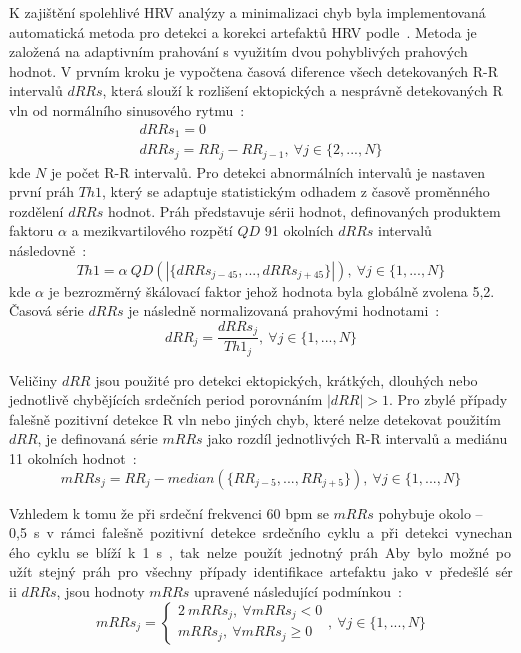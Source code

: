 K zajištění spolehlivé HRV analýzy a minimalizaci chyb byla implementovaná
automatická metoda pro detekci a korekci artefaktů HRV
podle~\cite{Lipponen2019}. Metoda je založená na adaptivním prahování s využitím
dvou pohyblivých prahových hodnot. V prvním kroku je vypočtena časová diference
všech detekovaných R-R intervalů $dRRs$, která slouží k rozlišení ektopických a
nesprávně detekovaných R vln od normálního sinusového rytmu~\cite{Lipponen2019}:
\begin{gather}
    dRRs_1 = 0 \nonumber \\
    dRRs_j = RR_j - RR_{j-1}, ~\forall j \in \{2,...,N\}
\end{gather}
kde $N$ je počet R-R intervalů. Pro detekci abnormálních intervalů je nastaven
první práh $Th1$, který se adaptuje statistickým odhadem z časově proměnného
rozdělení $dRRs$ hodnot. Práh představuje sérii hodnot, definovaných produktem
faktoru $\alpha$ a mezikvartilového rozpětí $QD$ 91 okolních $dRRs$ intervalů
následovně~\cite{Lipponen2019}:
\begin{equation}
    Th1 = \alpha~QD(|\{dRRs_{j-45},...,dRRs_{j+45}\}|), ~\forall j \in \{1,...,N\}
\end{equation}
kde $\alpha$ je bezrozměrný škálovací faktor jehož hodnota byla globálně zvolena
5,2. Časová série $dRRs$ je následně normalizovaná prahovými
hodnotami~\cite{Lipponen2019}:
\begin{equation}
    dRR_j = \frac{dRRs_j}{Th1_j}, ~\forall j \in \{1,...,N\}
\end{equation}

Veličiny $dRR$ jsou použité pro detekci ektopických, krátkých, dlouhých nebo
jednotlivě chybějících srdečních period porovnáním $|dRR|>1$. Pro zbylé případy
falešně pozitivní detekce R vln nebo jiných chyb, které nelze detekovat použitím
$dRR$, je definovaná série $mRRs$ jako rozdíl jednotlivých R-R intervalů a
mediánu 11 okolních hodnot~\cite{Lipponen2019}:
\begin{equation}
    mRRs_j = RR_j - median(\{RR_{j-5},...,RR_{j+5}\}), ~\forall j \in \{1,...,N\}
\end{equation}

Vzhledem k tomu že při srdeční frekvenci 60 bpm se $mRRs$ pohybuje okolo
--0,5~\si\s~v rámci falešně pozitivní detekce srdečního cyklu a při detekci
vynechaného cyklu se blíží k 1~\si\s, tak nelze použít jednotný práh. Aby bylo
možné použít stejný práh pro všechny případy identifikace artefaktu jako v
předešlé sérii $dRRs$, jsou hodnoty $mRRs$ upravené následující
podmínkou~\cite{Lipponen2019}:
\begin{equation}
    mRRs_j =
    \begin{cases}
        2~mRRs_j, ~\forall mRRs_j < 0 \\
        mRRs_j, ~\forall mRRs_j \geq 0
    \end{cases}
    , ~\forall j \in \{1,...,N\}
\end{equation}

